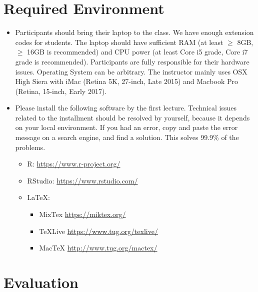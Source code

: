 \documentclass[
]{book}
\providecommand{\tightlist}{%
  \setlength{\itemsep}{0pt}\setlength{\parskip}{0pt}}
\begin{document}
\hypertarget{required-environment}{%
\section{Required Environment}\label{required-environment}}

\begin{itemize}
\tightlist
\item
  Participants should bring their laptop to the class. We have enough extension codes for students. The laptop should have sufficient RAM (at least \(\ge\) 8GB, \(\ge\) 16GB is recommended) and CPU power (at least Core i5 grade, Core i7 grade is recommended). Participants are fully responsible for their hardware issues. Operating System can be arbitrary. The instructor mainly uses OSX High Siera with iMac (Retina 5K, 27-inch, Late 2015) and Macbook Pro (Retina, 15-inch, Early 2017).
\item
  Please install the following software by the first lecture. Technical issues related to the installment should be resolved by yourself, because it depends on your local environment. If you had an error, copy and paste the error message on a search engine, and find a solution. This solves 99.9\% of the problems.

  \begin{itemize}
  \tightlist
  \item
    R: \url{https://www.r-project.org/}
  \item
    RStudio: \url{https://www.rstudio.com/}
  \item
    LaTeX:

    \begin{itemize}
    \tightlist
    \item
      MixTex \url{https://miktex.org/}
    \item
      TeXLive \url{https://www.tug.org/texlive/}
    \item
      MacTeX \url{http://www.tug.org/mactex/}
    \end{itemize}
  \end{itemize}
\end{itemize}

\hypertarget{evaluation}{%
\section{Evaluation}\label{evaluation}}
\end{document}
